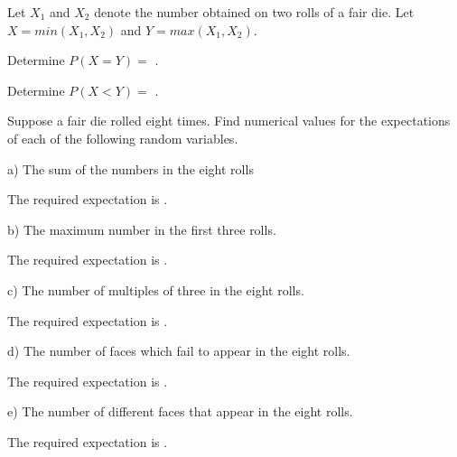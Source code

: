 \documentclass{ximera}
\begin{document}
Let $X_{1}$ and $X_{2}$ denote the number obtained on two rolls of a fair die. Let $X=min(X_1, X_2)$ and $Y=max(X_1, X_2)$.

\begin{question}
     \begin{solution}
          Determine $P(X=Y) = $ .
     \end{solution}
\end{question}

\begin{question}
     \begin{solution}
          Determine $P(X<Y) =$ .
     \end{solution}
\end{question}

Suppose a fair die rolled eight times. Find numerical values for the expectations of each of the following random variables.

\begin{question}
     a) The sum of the numbers in the eight rolls
     \begin{solution}
          The required expectation is .
     \end{solution}
\end{question}

\begin{question}
     b) The maximum number in the first three rolls.
     \begin{solution}
          The required expectation is .
     \end{solution}
\end{question}

\begin{question}
     c) The number of multiples of three in the eight rolls.
     \begin{solution}
          The required expectation is .
     \end{solution}
\end{question}

\begin{question}
     d) The number of faces which fail to appear in the eight rolls.
     \begin{solution}
          The required expectation is .
     \end{solution}
\end{question}

\begin{question}
     e) The number of different faces that appear in the eight rolls.
     \begin{solution}
          The required expectation is .
     \end{solution}
\end{question}
\end{document}
